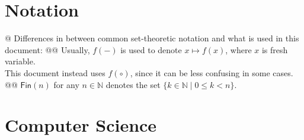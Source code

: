 \documentclass[]{article}
\newcommand{\mbb}[1]{\ensuremath{\mathbb{#1}}}     %
\newcommand{\msf}[1]{\ensuremath{\mathsf{#1}}}     %
\begin{document}

\section{Notation}

\begin{easylist}[itemize]
@ {%
  Differences in between common set-theoretic notation and what is used in
  this document:
}
@@ {%
  Usually, $f({-})$ is used to denote $x \mapsto f(x)$, where $x$ is fresh
  variable. \\ This document instead uses $f(\circ)$, since it can be less
  confusing in some cases.
}
@@ {%
  $\msf{Fin}(n)$ for any $n \in \mbb{N}$ denotes the set
  $\{k \in \mbb{N} \mid 0 \le k < n\}$.
}
\end{easylist}


\section{Computer Science}
\end{document}
